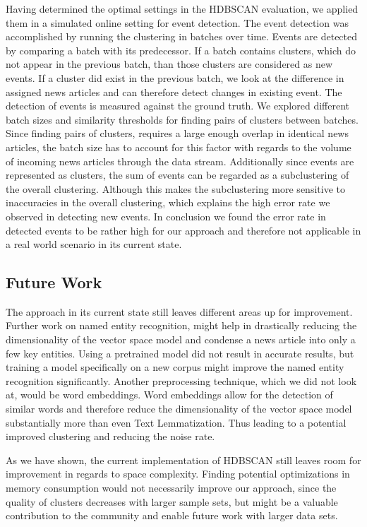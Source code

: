 Having determined the optimal settings in the HDBSCAN evaluation,
we applied them in a simulated online setting for event detection.
The event detection was accomplished by running the clustering in batches over time.
Events are detected by comparing a batch with its predecessor.
If a batch contains clusters, which do not appear in the previous batch,
than those clusters are considered as new events.
If a cluster did exist in the previous batch,
we look at the difference in assigned news articles and can therefore detect changes in existing event.
The detection of events is measured against the ground truth.
We explored different batch sizes and similarity thresholds for finding pairs of clusters between batches.
Since finding pairs of clusters, requires a large enough overlap in identical news articles,
the batch size has to account for this factor with regards to the volume of incoming news articles through the data stream.
Additionally since events are represented as clusters,
the sum of events can be regarded as a subclustering of the overall clustering.
Although this makes the subclustering more sensitive to inaccuracies in the overall clustering,
which explains the high error rate we observed in detecting new events.
In conclusion we found the error rate in detected events to be rather high for our approach
and therefore not applicable in a real world scenario in its current state.

\subsection{Future Work}
\label{subsec:6_future_work}

The approach in its current state still leaves different areas up for improvement.
Further work on named entity recognition, might help in drastically reducing the dimensionality of the vector space model
and condense a news article into only a few key entities.
Using a pretrained model did not result in accurate results,
but training a model specifically on a new corpus might improve the named entity recognition significantly.
Another preprocessing technique, which we did not look at, would be word embeddings.
Word embeddings allow for the detection of similar words and therefore reduce the dimensionality
of the vector space model substantially more than even Text Lemmatization.
Thus leading to a potential improved clustering and reducing the noise rate.

As we have shown, the current implementation of HDBSCAN still leaves room for improvement in regards to space complexity.
Finding potential optimizations in memory consumption would not necessarily improve our approach,
since the quality of clusters decreases with larger sample sets,
but might be a valuable contribution to the community and enable future work with larger data sets.

